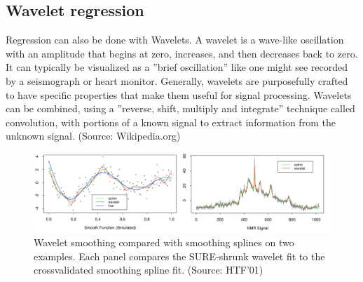 \documentclass[main]{subfiles}
\begin{document}
\subsection{Wavelet regression}
Regression can also be done with Wavelets. A wavelet is a wave-like oscillation with an amplitude that begins at zero, increases, and then decreases back to zero. It can typically be visualized as a ''brief oscillation'' like one might see recorded by a seismograph or heart monitor. Generally, wavelets are purposefully crafted to have specific properties that make them useful for signal processing. Wavelets can be combined, using a ''reverse, shift, multiply and integrate'' technique called convolution, with portions of a known signal to extract information from the unknown signal. (Source: Wikipedia.org)
\begin{figure}[H]
\includegraphics[width=\linewidth]{figs/Wavelet-vs-Spline}
\caption{Wavelet smoothing compared with smoothing splines on two examples. Each panel compares the SURE-shrunk wavelet fit to the crossvalidated smoothing spline fit. (Source: HTF'01)}
\end{figure}
\end{document}
